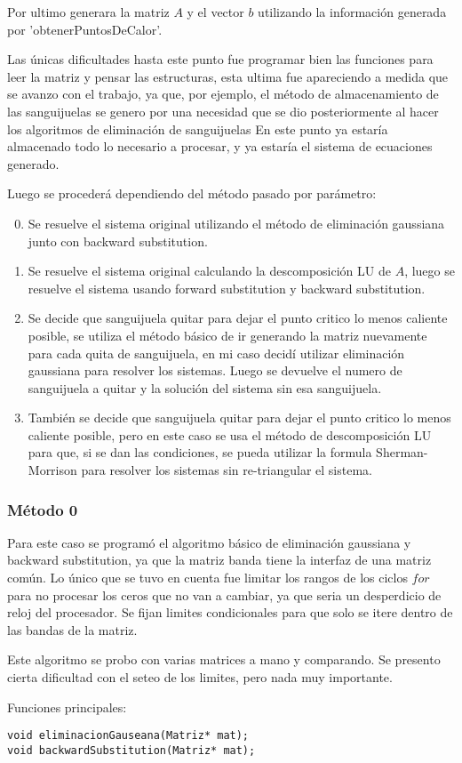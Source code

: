 \documentclass[a4paper]{article}
\begin{document}
Por ultimo generara la matriz $A$ y el vector $b$ utilizando la información generada por 'obtenerPuntosDeCalor'.\par
\smallskip
Las únicas dificultades hasta este punto fue programar bien las funciones para leer la matriz y pensar las estructuras, esta ultima fue apareciendo a medida que se avanzo con el trabajo, ya que, por ejemplo, el método de almacenamiento de las sanguijuelas se genero por una necesidad que se dio posteriormente al hacer los algoritmos de eliminación de sanguijuelas
\newline
\newline
En este punto ya estaría almacenado todo lo necesario a procesar, y ya estaría el sistema de ecuaciones generado.\par
\smallskip
Luego se procederá dependiendo del método pasado por parámetro:
\begin{enumerate}
\setcounter{enumi}{-1}
 \item Se resuelve el sistema original utilizando el método de eliminación gaussiana junto con backward substitution.
 \item Se resuelve el sistema original calculando la descomposición LU de $A$, luego se resuelve el sistema usando forward substitution y backward substitution.
 \item Se decide que sanguijuela quitar para dejar el punto critico lo menos caliente posible, se utiliza el método básico de ir generando la matriz nuevamente para cada quita de sanguijuela, en mi caso decidí utilizar eliminación gaussiana para resolver los sistemas. Luego se devuelve el numero de sanguijuela a quitar y la solución del sistema sin esa sanguijuela.
 \item También se decide que sanguijuela quitar para dejar el punto critico lo menos caliente posible, pero en este caso se usa el método de descomposición LU para que, si se dan las condiciones, se pueda utilizar la formula Sherman-Morrison para resolver los sistemas sin re-triangular el sistema. 
\end{enumerate}

\subsubsection{Método 0}
Para este caso se programó el algoritmo básico de eliminación gaussiana y backward substitution, ya que la matriz banda tiene la interfaz de una matriz común. Lo único que se tuvo en cuenta fue limitar los rangos de los ciclos $for$ para no procesar los ceros que no van a cambiar, ya que seria un desperdicio de reloj del procesador. Se fijan limites condicionales para que solo se itere dentro de las bandas de la matriz.\par
Este algoritmo se probo con varias matrices a mano y comparando. Se presento cierta dificultad con el seteo de los limites, pero nada muy importante.\par
\smallskip
Funciones principales:
\begin{lstlisting}
void eliminacionGauseana(Matriz* mat);
void backwardSubstitution(Matriz* mat);
\end{lstlisting}
\end{document}
